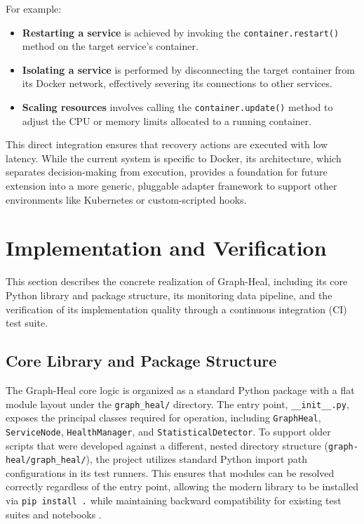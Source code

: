 \documentclass[11pt,conference]{IEEEtran}
\begin{document}
For example:
\begin{itemize}
    \item \textbf{Restarting a service} is achieved by invoking the \texttt{container.restart()} method on the target service's container.
    \item \textbf{Isolating a service} is performed by disconnecting the target container from its Docker network, effectively severing its connections to other services.
    \item \textbf{Scaling resources} involves calling the \texttt{container.update()} method to adjust the CPU or memory limits allocated to a running container.
\end{itemize}

This direct integration ensures that recovery actions are executed with low latency. While the current system is specific to Docker, its architecture, which separates decision-making from execution, provides a foundation for future extension into a more generic, pluggable adapter framework to support other environments like Kubernetes or custom-scripted hooks.



\section{Implementation and Verification}
\label{sec:implementation}

This section describes the concrete realization of Graph-Heal, including its core Python library and package structure, its monitoring data pipeline, and the verification of its implementation quality through a continuous integration (CI) test suite.

\subsection{Core Library and Package Structure}
\label{sec:core-library}

The Graph-Heal core logic is organized as a standard Python package with a flat module layout under the \texttt{graph\_heal/} directory. The entry point, \texttt{\_\_init\_\_.py}, exposes the principal classes required for operation, including \texttt{GraphHeal}, \texttt{ServiceNode}, \texttt{HealthManager}, and \texttt{StatisticalDetector}. To support older scripts that were developed against a different, nested directory structure (\texttt{graph-heal/graph\_heal/}), the project utilizes standard Python import path configurations in its test runners. This ensures that modules can be resolved correctly regardless of the entry point, allowing the modern library to be installed via \texttt{pip install .} while maintaining backward compatibility for existing test suites and notebooks \cite{code1}.
\end{document}
